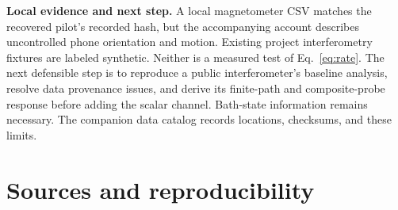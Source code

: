 \documentclass[11pt]{article}
\begin{document}
\textbf{Local evidence and next step.}
A local magnetometer CSV matches the recovered pilot's recorded hash,
but the accompanying account describes uncontrolled phone orientation and
motion. Existing project interferometry fixtures are labeled synthetic.
Neither is a measured test of Eq.~\eqref{eq:rate}. The next defensible step
is to reproduce a public interferometer's baseline analysis, resolve data
provenance issues, and derive its finite-path and composite-probe response
before adding the scalar channel. Bath-state information remains necessary.
The companion data catalog records locations, checksums, and these limits.

\newpage
\section*{Sources and reproducibility}
\end{document}

